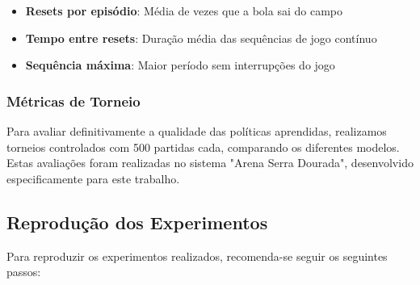 \begin{itemize}
    \item \textbf{Resets por episódio}: Média de vezes que a bola sai do campo
    \item \textbf{Tempo entre resets}: Duração média das sequências de jogo contínuo
    \item \textbf{Sequência máxima}: Maior período sem interrupções do jogo
\end{itemize}

\subsubsection{Métricas de Torneio}

Para avaliar definitivamente a qualidade das políticas aprendidas, realizamos torneios controlados com 500 partidas cada, comparando os diferentes modelos. Estas avaliações foram realizadas no sistema "Arena Serra Dourada", desenvolvido especificamente para este trabalho.

\subsection{Reprodução dos Experimentos}

Para reproduzir os experimentos realizados, recomenda-se seguir os seguintes passos:

